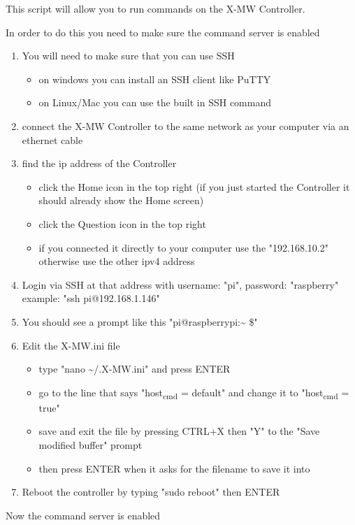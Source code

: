 \documentclass[11pt]{article}
\author{Cole Turner}
\date{\today}
\title{}
\begin{document}
\tableofcontents

This script will allow you to run commands on the X-MW Controller.

In order to do this you need to make sure the command server is enabled
\begin{enumerate}
\item You will need to make sure that you can use SSH
\begin{itemize}
\item on windows you can install an SSH client like PuTTY
\item on Linux/Mac you can use the built in SSH command
\end{itemize}
\item connect the X-MW Controller to the same network as your computer via an ethernet cable
\item find the ip address of the Controller
\begin{itemize}
\item click the Home icon in the top right
(if you just started the Controller it should already show the Home screen)
\item click the Question icon in the top right
\item if you connected it directly to your computer use the "192.168.10.2"
otherwise use the other ipv4 address
\end{itemize}
\item Login via SSH at that address with username: "pi", password: "raspberry"
example: "ssh pi@192.168.1.146"
\item You should see a prompt like this "pi@raspberrypi:\textasciitilde{} \$"
\item Edit the X-MW.ini file
\begin{itemize}
\item type "nano \textasciitilde{}/.X-MW.ini" and press ENTER
\item go to the line that says "host\textsubscript{cmd} = default" and change it to "host\textsubscript{cmd} = true"
\item save and exit the file by pressing CTRL+X then "Y" to the "Save modified buffer" prompt
\item then press ENTER when it asks for the filename to save it into
\end{itemize}
\item Reboot the controller by typing "sudo reboot" then ENTER
\end{enumerate}

Now the command server is enabled
\end{document}
